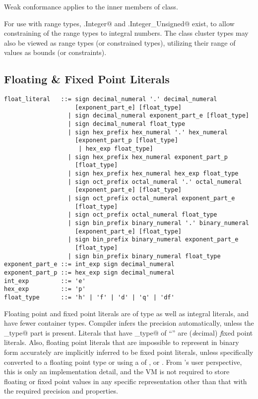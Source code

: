 Weak conformance applies to the inner members of \lstinline@Number@ class. 

For use with range types, \lstinline@Number.Integer@ and \lstinline@Number.Integer_Unsigned@ exist, to allow constraining of the range types to integral numbers. The class cluster types may also be viewed as range types (or constrained types), utilizing their range of values as bounds (or constraints). 






\subsection{Floating \& Fixed Point Literals}
\label{sec:floatliterals}
\label{sec:fixedpointliterals}

\syntax\begin{lstlisting}
float_literal   ::= sign decimal_numeral '.' decimal_numeral
                    [exponent_part_e] [float_type]
                  | sign decimal_numeral exponent_part_e [float_type]
                  | sign decimal_numeral float_type
                  | sign hex_prefix hex_numeral '.' hex_numeral 
                    [exponent_part_p [float_type] 
                     | hex_exp float_type]
                  | sign hex_prefix hex_numeral exponent_part_p 
                    [float_type]
                  | sign hex_prefix hex_numeral hex_exp float_type
                  | sign oct_prefix octal_numeral '.' octal_numeral 
                    [exponent_part_e] [float_type]
                  | sign oct_prefix octal_numeral exponent_part_e 
                    [float_type]
                  | sign oct_prefix octal_numeral float_type
                  | sign bin_prefix binary_numeral '.' binary_numeral 
                    [exponent_part_e] [float_type]
                  | sign bin_prefix binary_numeral exponent_part_e 
                    [float_type]
                  | sign bin_prefix binary_numeral float_type
exponent_part_e ::= int_exp sign decimal_numeral
exponent_part_p ::= hex_exp sign decimal_numeral
int_exp         ::= 'e'
hex_exp         ::= 'p'
float_type      ::= 'h' | 'f' | 'd' | 'q' | 'df'
\end{lstlisting}

Floating point and fixed point literals are of type \lstinline@Number@ as well as integral literals, and have fewer container types. Compiler infers the precision automatically, unless the \lstinline@float_type@ part is present. Literals that have \lstinline@float_type@ of ``'' are ({\em d}ecimal) {\em f}ixed point literals. Also, floating point literals that are impossible to represent in binary form accurately are implicitly inferred to be fixed point literals, unless specifically converted to a floating point type or using a  of ,  or . From 's user perspective, this is only an implementation detail, and the VM is not required to store floating or fixed point values in any specific representation other than that with the required precision and properties. 

